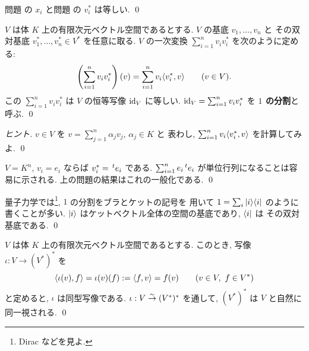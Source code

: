 \documentclass[12pt,twoside]{jarticle}
\begin{document}
\begin{rem}
  問題  の $x_i$ と問題  の $v^*_i$ は等しい.
  \qed
\end{rem}


\begin{question}[1の分解, 10点]
  \label{q:1=sum-vv*}
  $V$ は体 $K$ 上の有限次元ベクトル空間であるとする.
  $V$ の基底 $v_1,\ldots,v_n$ と
  その双対基底 $v^*_1,\ldots,v^*_n\in V^*$ を任意に取る.
  $V$ の一次変換 $\sum_{i=1}^n v_iv_i^*$ を次のように定める:
  \begin{equation*}
    \left(\sum_{i=1}^n v_iv_i^*\right)(v)
    = \sum_{i=1}^n v_i \langle v_i^*, v\rangle
    \qquad (v\in V).
  \end{equation*}
  この $\sum_{i=1}^n v_iv_i^*$ は $V$ の恒等写像 $\mathop{\mathrm{id}}\nolimits_V$ に等しい.
  $\mathop{\mathrm{id}}\nolimits_V = \sum_{i=1}^n v_iv_i^*$ を {\bf $1$ の分割}と呼ぶ.
  \qed
\end{question}

\begin{proof}[ヒント]
  $v\in V$ を $v=\sum_{j=1}^n \alpha_j v_j$, $\alpha_j\in K$ と
  表わし, $\sum_{i=1}^n v_i \langle v_i^*, v\rangle$ を計算してみよ.
  \qed
\end{proof}

\begin{rem}
  $V=K^n$, $v_i=e_i$ ならば $v^*_i=\tp{e_i}$ である.
  $\sum_{i=1}^n e_i\tp{e_i}$ が単位行列になることは容易に示される.
  上の問題の結果はこれの一般化である.
  \qed
\end{rem}

\begin{guide}
  量子力学では\footnote{Dirac \cite{Dirac} などを見よ.}, 
  $1$ の分割をブラとケットの記号を
  用いて $1 = \sum_i |i\rangle \langle i|$ のように書くことが多い. 
  $|i\rangle$ はケットベクトル全体の空間の基底であり, $\langle i|$ は
  その双対基底である.
  \qed
\end{guide}


\begin{question}[双対の双対, 10点]
  $V$ は体 $K$ 上の有限次元ベクトル空間であるとする.
  このとき, 写像 $\iota: V\to (V^*)^*$ を
  \begin{equation*}
    \langle \iota(v), f\rangle = \iota(v)(f) := \langle f, v\rangle = f(v)
    \qquad (v\in V,\ f\in V^*)
  \end{equation*}
  と定めると, $\iota$ は同型写像である.
  $\iota:V\overset\sim\rightarrow (V^*)^*$ を通して, $(V^*)^*$ は $V$ と自然に同一視される.
  \qed
\end{question}
\end{document}
